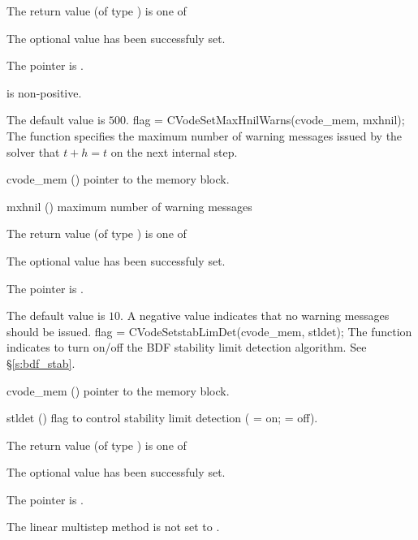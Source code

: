 {
  The return value  (of type ) is one of
  \begin{args}
  \item[\Id{SUCCESS}] 
    The optional value has been successfuly set.
  \item[\Id{CVS\_NO\_MEM}]
    The  pointer is .
  \item[\Id{CVS\_ILL\_INPUT}]
     is non-positive.
  \end{args}
}
{
  The default value is $500$.
}
{
flag = CVodeSetMaxHnilWarns(cvode\_mem, mxhnil);
}
{
  The function  specifies the maximum number of warning messages
  issued by the solver that $t+h=t$ on the next internal step.
}
{
  \begin{args}
  \item[cvode\_mem] ()
    pointer to the {\cvode} memory block.
  \item[mxhnil] ()
    maximum number of warning messages
  \end{args}
}
{
  The return value  (of type ) is one of
  \begin{args}
  \item[\Id{SUCCESS}] 
    The optional value has been successfuly set.
  \item[\Id{CVS\_NO\_MEM}]
    The  pointer is .
  \end{args}
}
{
  The default value is $10$.
  A negative  value indicates that no warning messages should
  be issued.
}
{
flag = CVodeSetstabLimDet(cvode\_mem, stldet);
}
{
  The function  indicates to turn on/off
  the BDF stability limit detection algorithm. See \S\ref{s:bdf_stab}.
}
{
  \begin{args}
  \item[cvode\_mem] ()
    pointer to the {\cvode} memory block.
  \item[stldet] ()
    flag to control stability limit detection ( = on;  = off).
  \end{args}
}
{
  The return value  (of type ) is one of
  \begin{args}
  \item[\Id{SUCCESS}] 
    The optional value has been successfuly set.
  \item[\Id{CVS\_NO\_MEM}]
    The  pointer is .
  \item[\Id{CVS\_ILL\_INPUT}]
    The linear multistep method is not set to .
  \end{args}
}
